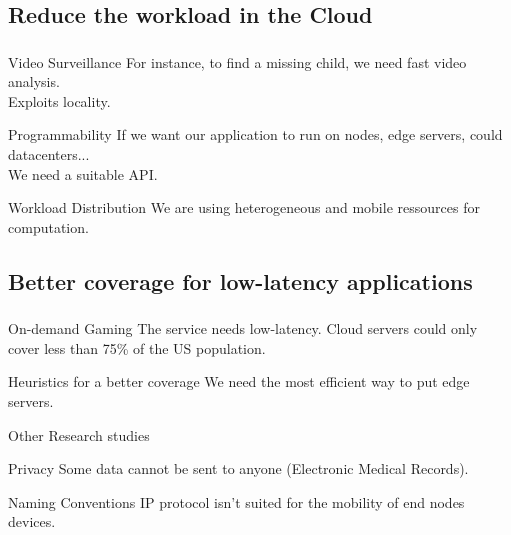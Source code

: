 \documentclass[utf8,xcolor=table, page number]{earlywinter}
\begin{document}
\subsection{Reduce the workload in the Cloud}
\begin{frame}
  \frametitle{\secname}
  \framesubtitle{\subsecname}

  \begin{exampleblock}{Video Surveillance}
    For instance, to find a missing child, we need fast video analysis.\\
    Exploits locality.
  \end{exampleblock}

  \begin{alertblock}{Programmability}
    If we want our application to run on nodes, edge servers, could datacenters...\\
    We need a suitable API.
  \end{alertblock}

  \begin{alertblock}{Workload Distribution}
    We are using heterogeneous and mobile ressources for computation.
  \end{alertblock}
  
\end{frame}


\subsection{Better coverage for low-latency applications}
\begin{frame}
  \frametitle{\secname}
  \framesubtitle{\subsecname}

  \begin{exampleblock}{On-demand Gaming}
    The service needs low-latency. Cloud servers could only cover less than 75\% of the US population.
  \end{exampleblock}

  \begin{alertblock}{Heuristics for a better coverage}
    We need the most efficient way to put edge servers.
  \end{alertblock}
  
\end{frame}



\begin{frame}{Other Research studies} %
  
  \begin{alertblock}{Privacy}
    Some data cannot be sent to anyone (Electronic Medical Records).
  \end{alertblock}

  \begin{alertblock}{Naming Conventions}
    IP protocol isn't suited for the mobility of end nodes devices.
  \end{alertblock}

  
\end{frame}
\end{document}

